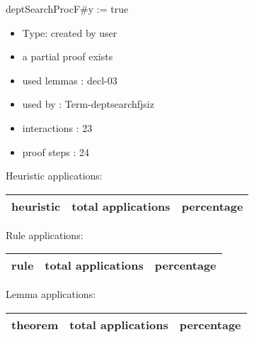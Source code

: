 \documentclass[a4paper]{article}
\begin{document}
\medskip

 \Fol \Do deptSearchProcF\#\Dc \Do y := \Dc true

\begin{itemize}

\item Type: created by user

\item       a partial proof exists
\item       used lemmas  : decl-03
\item       used by      : Term-deptsearchfjsiz
\item       interactions : 23
\item       proof steps  : 24
\end{itemize}

\medskip


Heuristic applications:

\begin{supertabular}{l|r|r}
heuristic	& total applications & percentage \\ \hline

\end{supertabular}

Rule applications:

\begin{supertabular}{l|r|r}
rule	        & total applications & percentage \\ \hline

\end{supertabular}

Lemma applications:

\begin{supertabular}{l|r|r}
theorem	        & total applications & percentage \\ \hline

\end{supertabular}
\end{document}
